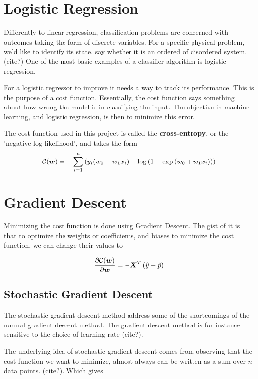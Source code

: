 \section{Logistic Regression}\label{seq:logistic}
Differently to linear regression, classification problems
are concerned with outcomes taking the form of discrete variables.
For a specific physical problem, we'd like to identify its state, say whether
it is an ordered of disordered system. (cite?) One of the most basic examples
of a classifier algorithm is logistic regression.

For a logistic regressor to improve it needs a way to
track its performance. This is the purpose of a cost function. Essentially,
the cost function says something about how wrong the model is in classifying the
input. The objective in machine learning, and logistic regression, is then to minimize
this error.

The cost function used in this project is called the \textbf{cross-entropy}, or the
'negative log likelihood', and takes the form
\begin{equation}\label{eq:cross-entropy}
	\mathcal{C}({\boldsymbol{w}})=-\sum_{i=1}^n  \left(y_i(w_0+w_1x_i) -\log{(1+\exp{(w_0+w_1x_i)})}\right)
\end{equation}

\section{Gradient Descent}\label{seq:gradient}
Minimizing the cost function is done using Gradient Descent.
The gist of it is that to optimize the weights or coefficients,
and biases to minimize the cost function, we can change their values to

\begin{equation}\label{eq:delta-c}
	\frac{\partial \mathcal{C}({\boldsymbol{w}})}{\partial {\boldsymbol{w}}} = -{\boldsymbol{X}}^T\left(\hat{y}-\hat{p}\right)
\end{equation}

\subsection{Stochastic Gradient Descent}
The stochastic gradient descent method address some of the shortcomings
of the normal gradient descent method. The gradient descent method is
for instance sensitive to the choice of learning rate (cite?).

The underlying idea of stochastic gradient descent comes from observing
that the cost function we want to minimize, almost always can be written as
a sum over \(n\) data points. (cite?). Which gives

